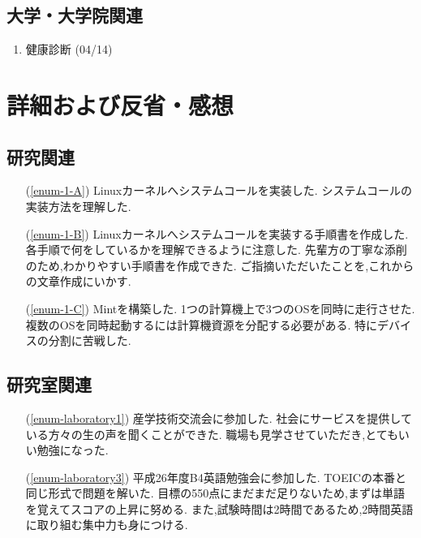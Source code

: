 \documentclass[fleqn, 14pt]{extarticle}
\begin{document}
\subsection{大学・大学院関連}
\label{sec-2-3}

\begin{enumerate}
\item 健康診断
\hfill
\label{enum-university1}
(04/14)
\end{enumerate}

\section{詳細および反省・感想}
\label{sec-3}
\subsection{研究関連}
\label{sec-3-1}

\begin{itemize}
\item[(\ref{enum-1-A})]
Linuxカーネルへシステムコールを実装した.
システムコールの実装方法を理解した.
\item[(\ref{enum-1-B})]
Linuxカーネルへシステムコールを実装する手順書を作成した.
各手順で何をしているかを理解できるように注意した.
先輩方の丁寧な添削のため,わかりやすい手順書を作成できた.
ご指摘いただいたことを,これからの文章作成にいかす.
\item[(\ref{enum-1-C})]
Mintを構築した.
1つの計算機上で3つのOSを同時に走行させた.
複数のOSを同時起動するには計算機資源を分配する必要がある.
特にデバイスの分割に苦戦した.
\end{itemize}

\subsection{研究室関連}
\label{sec-3-2}

\begin{itemize}
\item[(\ref{enum-laboratory1})]
産学技術交流会に参加した.
社会にサービスを提供している方々の生の声を聞くことができた.
職場も見学させていただき,とてもいい勉強になった.
\item[(\ref{enum-laboratory3})]
平成26年度B4英語勉強会に参加した.
TOEICの本番と同じ形式で問題を解いた.
目標の550点にまだまだ足りないため,まずは単語を覚えてスコアの上昇に努める.
また,試験時間は2時間であるため,2時間英語に取り組む集中力も身につける.
\end{itemize}
\end{document}
